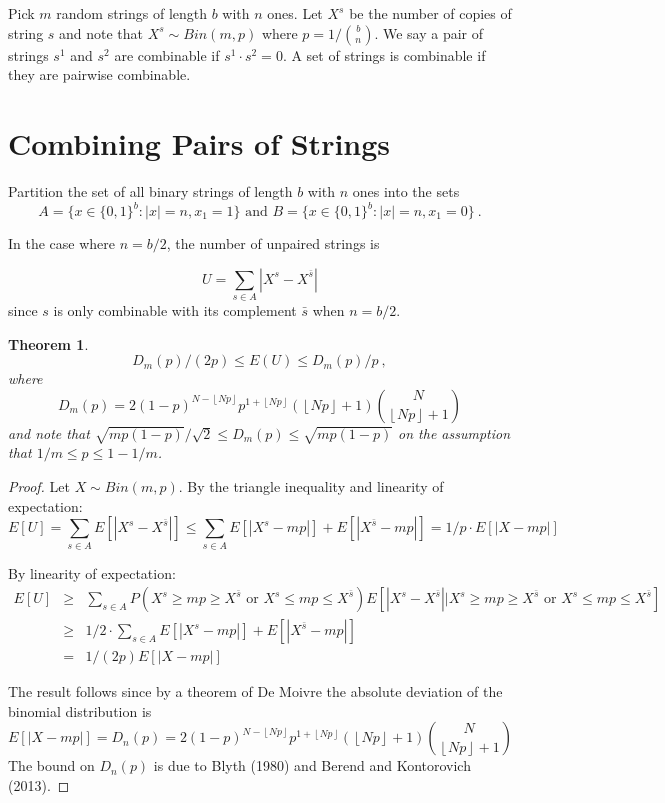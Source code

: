 \documentclass[11pt]{article}
\newtheorem{theorem}{Theorem}[section]
\newcommand{\rounddown}[1]{\left \lfloor  #1 \right \rfloor}
\begin{document}
Pick $m$ random strings of length $b$ with $n$ ones.
Let $X^s$ be the number of copies of string $s$ and note that $X^s \sim Bin(m,p)$ where $p=1/{b \choose n}$. 
We say a pair of strings $s^1$ and $s^2$ are combinable if $s^1\cdot s^2=0$. A set of strings is combinable if they are pairwise combinable.

\section{Combining Pairs of Strings}

Partition the set of all binary strings of length $b$ with $n$ ones into the sets
\[A=\{x\in \{0,1\}^b: |x|=n, x_1=1\} \mbox{ and }
B=\{x\in \{0,1\}^b: |x|=n, x_1=0\} \ .\]


In the case where $n=b/2$, the number of unpaired strings is 

\[U=\sum_{s\in A} |X^s-X^{\bar{s}}|\] 
since $s$ is only combinable with its complement $\bar{s}$ when $n=b/2$.

\begin{theorem}
\[D_m(p)/(2p) \leq E(U) \leq D_m(p)/p \ ,\]
where 
\[D_m(p)=2(1-p)^{N-\rounddown{Np}}p^{1+\rounddown{Np}}(\rounddown{Np}+1){N\choose \rounddown{Np}+1}\]
and note that $\sqrt{mp(1-p)}/\sqrt{2} \leq D_m(p)\leq \sqrt{mp(1-p)}$ on the assumption that $1/m\leq p\leq 1-1/m$.
\end{theorem}
\begin{proof}
Let $X\sim Bin(m,p)$.
By the triangle inequality and linearity of expectation:
\[E[U]=\sum_{s\in A} E[|X^s-X^{\bar{s}}|]
\leq \sum_{s\in A} E[|X^s-mp|] + E[|X^{\bar{s}}-mp|]
=1/p \cdot E[|X-mp|]
\]

By linearity of expectation:
\begin{eqnarray*}
E[U]
& \geq & 
\sum_{s\in A} P(X^s\geq mp\geq X^{\bar{s}} \mbox{ or } X^s\leq mp\leq  X^{\bar{s}}) 
E[|X^s-X^{\bar{s}}| \big | X^s\geq mp\geq X^{\bar{s}} \mbox{ or } X^s\leq mp\leq  X^{\bar{s}}] \\
& \geq & 1/2 \cdot 
\sum_{s\in A} E[|X^s-mp|] + E[|X^{\bar{s}}-mp|]\\
& = & 1/(2p)  E[|X-mp|]
\end{eqnarray*}

The result follows since by a theorem of De Moivre the absolute deviation of the binomial distribution is 
\[E[|X-mp|]=D_n(p)=2(1-p)^{N-\rounddown{Np}}p^{1+\rounddown{Np}}(\rounddown{Np}+1){N\choose \rounddown{Np}+1}\] 
The bound on $D_n(p)$ is due to Blyth (1980) and  Berend and  Kontorovich (2013).
\end{proof}
\end{document}
